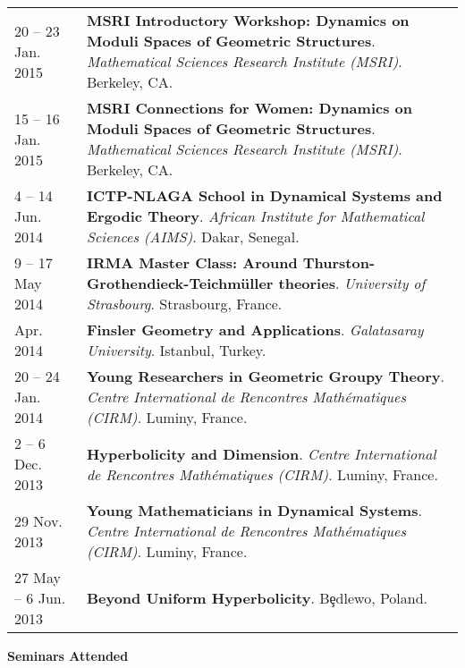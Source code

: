 \begin{center}
{\begin{longtable}{p{}  p{}}
20  -- 23 Jan.  2015 & \textbf{MSRI Introductory Workshop: Dynamics on Moduli Spaces of Geometric Structures}. \textit{Mathematical Sciences Research Institute (MSRI)}.  Berkeley, CA.  \\ 
15  -- 16 Jan.  2015 & \textbf{MSRI Connections for Women: Dynamics on Moduli Spaces of Geometric Structures}. \textit{Mathematical Sciences Research Institute (MSRI)}.  Berkeley, CA.  \\ 
4  -- 14 Jun.  2014 & \textbf{ICTP-NLAGA School in Dynamical Systems and Ergodic Theory}. \textit{African Institute for Mathematical Sciences (AIMS)}.  Dakar, Senegal.  \\ 
9  -- 17 May  2014 & \textbf{IRMA Master Class: Around Thurston-Grothendieck-Teichm\"uller theories}. \textit{University of Strasbourg}.  Strasbourg, France.  \\ 
 Apr.  2014 & \textbf{Finsler Geometry and Applications}. \textit{Galatasaray University}.  Istanbul, Turkey.  \\ 
20  -- 24 Jan.  2014 & \textbf{Young Researchers in Geometric Groupy Theory}. \textit{Centre International de Rencontres Math\'ematiques (CIRM)}.  Luminy, France.  \\ 
2  -- 6 Dec.  2013 & \textbf{Hyperbolicity and Dimension}. \textit{Centre International de Rencontres Math\'ematiques (CIRM)}.  Luminy, France.  \\ 
29 Nov.  2013 & \textbf{Young Mathematicians in Dynamical Systems}. \textit{Centre International de Rencontres Math\'ematiques (CIRM)}.  Luminy, France.  \\ 
27 May  -- 6 Jun.  2013 & \textbf{Beyond Uniform Hyperbolicity}.  B\c{e}dlewo, Poland.  
    \end{longtable}
    } 
    \end{center}

    \vspace{-1em}
    

    \textbf{\large Seminars Attended}
    
